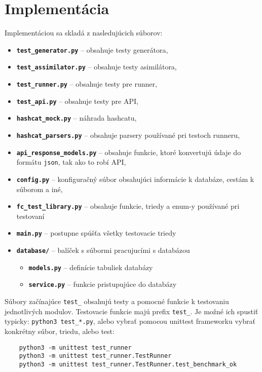 \chapter{Implementácia}
Implementáciou sa skladá z nasledujúcich súborov:
\begin{itemize}
	\item \textbf{\texttt{test\_generator.py}} -- obsahuje testy generátora,
	\item \textbf{\texttt{test\_assimilator.py}} -- obsahuje testy asimilátora,
	\item \textbf{\texttt{test\_runner.py}} -- obsahuje testy pre runner,
	\item \textbf{\texttt{test\_api.py}} -- obsahuje testy pre API,
	\item \textbf{\texttt{hashcat\_mock.py}} -- náhrada hashcatu,
	\item \textbf{\texttt{hashcat\_parsers.py}} -- obsahuje parsery používané pri testoch runneru,
	\item \textbf{\texttt{api\_response\_models.py}} -- obsahuje funkcie, ktoré konvertujú údaje do formátu \texttt{json}, tak ako to robí API,
	\item \textbf{\texttt{config.py}} -- konfiguračný súbor obsahujúci informácie k databáze, cestám k súborom a iné,
	\item \textbf{\texttt{fc\_test\_library.py}} -- obsahuje funkcie, triedy a enum-y používané pri testovaní
	\item \textbf{\texttt{main.py}} -- postupne spúšťa všetky testovacie triedy
	\item \textbf{\texttt{database/}} -- balíček s súbormi pracujucími s databázou
		\begin{itemize}
			\item \textbf{\texttt{models.py}} -- definície tabuliek databázy
			\item \textbf{\texttt{service.py}} -- funkcie pristupujúce do databázy
		\end{itemize}
\end{itemize}
Súbory začínajúce \texttt{test\_} obsahujú testy a pomocné funkcie k testovaniu jednotlivých modulov.
Testovacie funkcie majú prefix \texttt{test\_}.
Je možné ich spustiť typicky: \texttt{python3 test\_*.py}, alebo vybrať pomocou unittest frameworku vybrať konkrétny súbor, triedu, alebo test:
\begin{verbatim}
	python3 -m unittest test_runner
	python3 -m unittest test_runner.TestRunner
	python3 -m unittest test_runner.TestRunner.test_benchmark_ok
\end{verbatim}


